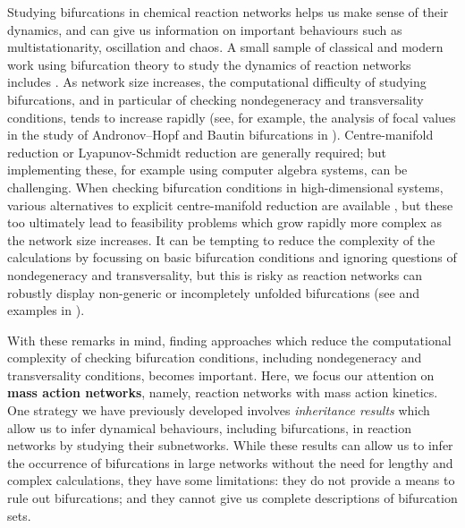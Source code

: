 \documentclass[11pt]{amsart}
\theoremstyle{definition}
\begin{document}
Studying bifurcations in chemical reaction networks helps us make sense of their dynamics, and can give us information on important behaviours such as multistationarity, oscillation and chaos. A small sample of classical and modern work using bifurcation theory to study the dynamics of reaction networks includes \cite{frank-kamenetsky:salnikov:1943, Selkov1968, DiCera1989, Gatermann2005, Conradi2007, abphopf, errami2015, Plesa2015, obatake2019, banajiborosnonlinearity, Vassena2023,banaji:boros:hofbauer:2025, Huang2025}. As network size increases, the computational difficulty of studying bifurcations, and in particular of checking nondegeneracy and transversality conditions, tends to increase rapidly (see, for example, the analysis of focal values in the study of Andronov--Hopf and Bautin bifurcations in \cite{banajiborosnonlinearity,boros_github}). Centre-manifold reduction \cite{carr2012applications} or Lyapunov-Schmidt reduction \cite{golubitsky1985} are generally required; but implementing these, for example using computer algebra systems, can be challenging. When checking bifurcation conditions in high-dimensional systems, various alternatives to explicit centre-manifold reduction are available \cite[Chapter 5]{kuznetsov:2023}, but these too ultimately lead to feasibility problems which grow rapidly more complex as the network size increases. It can be tempting to reduce the complexity of the calculations by focussing on basic bifurcation conditions and ignoring questions of nondegeneracy and transversality, but this is risky as reaction networks can robustly display non-generic or incompletely unfolded bifurcations (see \cite{banaji:boros:hofbauer:2023} and examples in \cite{banajiborosnonlinearity,BBH2024smallbif}).

With these remarks in mind, finding approaches which reduce the computational complexity of checking bifurcation conditions, including nondegeneracy and transversality conditions, becomes important. Here, we focus our attention on {\bf mass action networks}, namely, reaction networks with mass action kinetics. One strategy we have previously developed involves {\em inheritance results} \cite{banaji:boros:hofbauer:2025} which allow us to infer dynamical behaviours, including bifurcations, in reaction networks by studying their subnetworks. While these results can allow us to infer the occurrence of bifurcations in large networks without the need for lengthy and complex calculations, they have some limitations: they do not provide a means to rule out bifurcations; and they cannot give us complete descriptions of bifurcation sets. 
\end{document}
